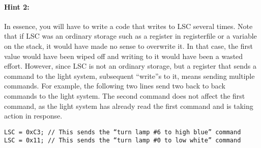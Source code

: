 \documentclass[12pt,letterpaper,titlepage]{article}
\begin{document}
\begin{raggedright}
\paragraph{Hint 2: }
In essence, you will have to write a code that writes to LSC several times. Note that if LSC was an ordinary storage such as a register in registerfile or a variable on the stack, it would have made no sense to overwrite it. In that case, the first value would have been wiped off and writing to it would have been a wasted effort. However, since LSC is not an ordinary storage, but a register that sends a command to the light system, subsequent “write”s to it, means sending multiple commands. For example, the following two lines send two back to back commands to the light system. The second command does not affect the first command, as the light system has already read the first command and is taking action in response. 
\begin{lstlisting}
LSC = 0xC3; // This sends the “turn lamp #6 to high blue” command
LSC = 0x11; // This sends the “turn lamp #0 to low white” command
\end{lstlisting}


\end{raggedright}
\end{document}
